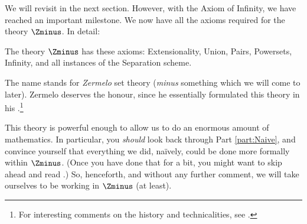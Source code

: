 \documentclass[../../../include/open-logic-section]{subfiles}
\begin{document}
We will revisit \stagesinf{} in the next section. However, with the Axiom of Infinity, we have reached an important milestone. We now have all the axioms required for the theory $\Zminus$. In detail:
\begin{defn}
	The theory $\Zminus$ has these axioms: Extensionality, Union, Pairs, Powersets, Infinity, and all instances of the Separation scheme.
\end{defn}\noindent
The name stands for \emph{Zermelo} set theory (\emph{minus} something which we will come to later). Zermelo deserves the honour, since he essentially formulated this theory in his \citeyear{Zermelo1908Untersuchungen}.\footnote{For interesting comments on the history and technicalities, see \citet[Appendix A]{Potter2004}.}

This theory is powerful enough to allow us to do an enormous amount of mathematics. In particular, you \emph{should} look back through Part \ref{part:Naive}, and convince yourself that everything we did, na\"ively, could be done more formally within $\Zminus$. (Once you have done that for a bit, you might want to skip ahead and read .) So, henceforth, and without any further comment, we will take ourselves to be working in $\Zminus$ (at least).
\end{document}
